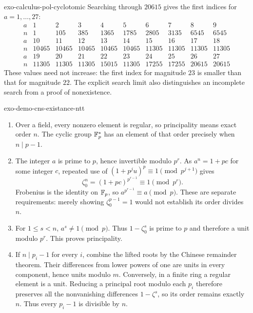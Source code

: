 \begin{correction}{exo-calculus-pol-cyclotomic}
Searching through $20615$ gives the first indices for $a=1,\ldots,27$:
\[
\begin{array}{c|rrrrrrrrr}
a&1&2&3&4&5&6&7&8&9\\\hline
n&1&105&385&1365&1785&2805&3135&6545&6545\\[2pt]
a&10&11&12&13&14&15&16&17&18\\\hline
n&10465&10465&10465&10465&10465&11305&11305&11305&11305\\[2pt]
a&19&20&21&22&23&24&25&26&27\\\hline
n&11305&11305&11305&15015&11305&17255&17255&20615&20615
\end{array}
\]
These values need not increase: the first index for magnitude $23$
is smaller than that for magnitude $22$. The explicit search limit
also distinguishes an incomplete search from a proof of nonexistence.
\begin{listing}[H]

\caption{First occurrences of cyclotomic coefficient magnitudes.}
\label{listing-calcul-pol-cyclo}
\end{listing}
\end{correction}

\begin{correction}{exo-demo-cns-existance-ntt}
\begin{enumerate}
\item Over a field, every nonzero element is regular, so principality
means exact order $n$. The cyclic group $\mathbb{F}_p^*$ has an element of that
order precisely when $n\mid p-1$.
\item The integer $a$ is prime to $p$, hence invertible modulo $p^r$.
As $a^n=1+pc$ for some integer $c$, repeated use of
$(1+p^ju)^p\equiv1\pmod{p^{j+1}}$ gives
\[
 \zeta_0^n=(1+pc)^{p^{r-1}}\equiv1\pmod{p^r}.
\]
Frobenius is the identity on $\mathbb{F}_p$, so
$a^{p^{r-1}}\equiv a\pmod p$. These are separate requirements: merely
showing $\zeta_0^{p-1}=1$ would not establish its order divides $n$.
\item For $1\leq s<n$, $a^s\ne1\pmod p$. Thus
$1-\zeta_0^s$ is prime to $p$ and therefore a unit modulo $p^r$.
This proves principality.
\item If $n\mid p_i-1$ for every $i$, combine the lifted roots by the
Chinese remainder theorem. Their differences from lower powers of one
are units in every component, hence units modulo $m$. Conversely, in a
finite ring a regular element is a unit. Reducing a principal root modulo
each $p_i$ therefore preserves all the nonvanishing differences
$1-\zeta^s$, so its order remains exactly $n$. Thus every $p_i-1$ is
divisible by $n$.
\end{enumerate}
\end{correction}


